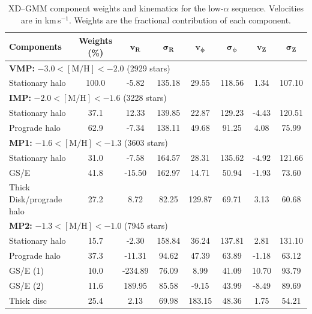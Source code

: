 \documentclass[a4paper,12pt]{article}
\begin{document}
\begin{table}[H]
\centering
\begin{tabular}{lccccccc}
\hline
\textbf{Components} & \textbf{Weights (\%)} & $\mathbf{v_R}$ & $\boldsymbol{\sigma_R}$ & $\mathbf{v_\phi}$ & $\boldsymbol{\sigma_\phi}$ & $\mathbf{v_Z}$ & $\boldsymbol{\sigma_Z}$ \\
\hline
\multicolumn{8}{l}{\textbf{VMP:} $-3.0 < \mathrm{[M/H]} < -2.0$ (2929 stars)} \\
Stationary halo     & 100.0 &  -5.82 & 135.18 &  29.55 & 118.56 &  1.34 & 107.10 \\
\hline
\multicolumn{8}{l}{\textbf{IMP:} $-2.0 < \mathrm{[M/H]} < -1.6$ (3228 stars)} \\
Stationary halo     &  37.1 &  12.33 & 139.85 &  22.87 & 129.23 & -4.43 & 120.51 \\
Prograde halo       &  62.9 &  -7.34 & 138.11 &  49.68 &  91.25 &  4.08 &  75.99 \\
\hline
\multicolumn{8}{l}{\textbf{MP1:} $-1.6 < \mathrm{[M/H]} < -1.3$ (3603 stars)} \\
Stationary halo     &  31.0 &  -7.58 & 164.57 &  28.31 & 135.62 & -4.92 & 121.66 \\
GS/E                &  41.8 & -15.50 & 162.97 &  14.71 &  50.94 & -1.93 &  73.60 \\
Thick Disk/prograde halo   &  27.2 &   8.72 &  82.25 & 129.87 &  69.71 &  3.13 &  60.68 \\
\hline
\multicolumn{8}{l}{\textbf{MP2:} $-1.3 < \mathrm{[M/H]} < -1.0$ (7945 stars)} \\
Stationary halo     &  15.7 &  -2.30 & 158.84 &  36.24 & 137.81 &  2.81 & 131.10 \\
Prograde halo       &  37.3 & -11.31 &  94.62 &  47.39 &  63.89 & -1.18 &  63.12 \\
GS/E (1)            &  10.0 &-234.89 &  76.09 &   8.99 &  41.09 & 10.70 &  93.79 \\
GS/E (2)            &  11.6 & 189.95 &  85.58 &  -9.15 &  43.99 & -8.49 &  89.69 \\
Thick disc          &  25.4 &   2.13 &  69.98 & 183.15 &  48.36 &  1.75 &  54.21 \\
\hline
\end{tabular}
\caption{XD--GMM component weights and kinematics for the low-$\alpha$ sequence.  
         Velocities are in km\,s$^{-1}$. Weights are the fractional contribution of each component.}
\label{tab:gmm_lowa_stats}
\end{table}
\end{document}
